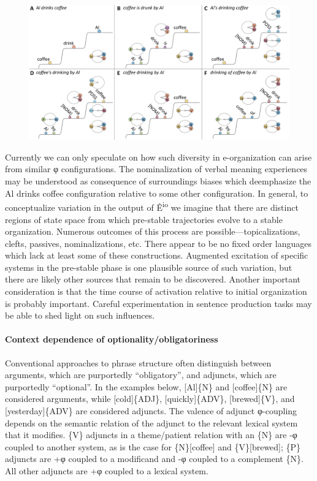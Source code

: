   
\begin{figure}
\includegraphics[width=\textwidth]{figures/Tilsen-img82.png}
\caption{\missingcaption}
\label{fig:}
\end{figure}
 

  Currently we can only speculate on how such diversity in e-organization can arise from similar φ configurations. The nominalization of verbal meaning experiences may be understood as consequence of surroundings biases which deemphasize the {\textbar}Al drinks coffee{\textbar} configuration relative to some other configuration. In general, to conceptualize variation in the output of Ê\textsuperscript{io} we imagine that there are distinct regions of state space from which pre-stable trajectories evolve to a stable organization. Numerous outcomes of this process are possible—topicalizations, clefts, passives, nominalizations, etc. There appear to be no fixed order languages which lack at least some of these constructions. Augmented excitation of specific systems in the pre-stable phase is one plausible source of such variation, but there are likely other sources that remain to be discovered. Another important consideration is that the time course of activation relative to initial organization is probably important. Careful experimentation in sentence production tasks may be able to shed light on such influences.

\paragraph{Context dependence of optionality/obligatoriness}

Conventional approaches to phrase structure often distinguish between arguments, which are purportedly “obligatory”, and adjuncts, which are purportedly “optional”. In the examples below, [Al]\{N\} and [coffee]\{N\} are considered arguments, while [cold]\{ADJ\}, [quickly]\{ADV\}, [brewed]\{V\}, and [yesterday]\{ADV\} are considered adjuncts. The valence of adjunct φ-coupling depends on the semantic relation of the adjunct to the relevant lexical system that it modifies. \{V\} adjuncts in a theme/patient relation with an \{N\} are -φ coupled to another system, as is the case for \{N\}[coffee] and \{V\}[brewed]; \{P\} adjuncts are +φ coupled to a modificand and -φ coupled to a complement \{N\}. All other adjuncts are +φ coupled to a lexical system.

